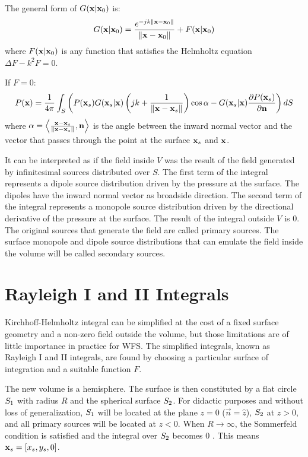 The general form of $G(\PosTheo \vert \PosTheo_0)$ is:
\begin{equation}
G(\PosTheo \vert \PosTheo_0) = \GreenFunc[\PosTheo - \PosTheo_0] + F(\PosTheo \vert \PosTheo_0)
\label{GreensFunction}
\end{equation}
where $F(\PosTheo \vert \PosTheo_0)$ is any function that satisfies the Helmholtz equation $\Delta F - k^2 F = 0$.

If $F = 0$:
\begin{equation}
P(\PosTheo) = \frac{1}{4\pi} \int_{S} \left(P(\PosTheo[surface]) G(\PosTheo[surface] \vert \PosTheo)\left(jk + \frac{1}{\norm{\PosTheo - \PosTheo[surface]}}\right)\cos\normSecondPropAngle - G(\PosTheo[surface] \vert \PosTheo) \frac{\partial P(\PosTheo[surface])}{\partial \mathbf{n}} \right) dS
\end{equation}
where $\normSecondPropAngle = \left\langle \frac{\PosTheo - \PosTheo[surface]}{\norm{\PosTheo - \PosTheo[surface]}} , \vec{n} \right\rangle$ is the angle between the inward normal vector and the vector that passes through the point at the surface $\PosTheo[surface]$ and $\PosTheo$.

It can be interpreted as if the field inside $V$ was the result of the field generated by infinitesimal sources distributed over $S$. The first term of the integral represents a dipole source distribution driven by the pressure at the surface. The dipoles have the inward normal vector as broadside direction. The second term of the integral represents a monopole source distribution driven by the directional derivative of the pressure at the surface. The result of the integral outside $V$ is $0$. The original sources that generate the field are called primary sources. The surface monopole and dipole source distributions that can emulate the field inside the volume will be called secondary sources.

\section{Rayleigh I and II Integrals}
Kirchhoff-Helmholtz integral can be simplified at the cost of a fixed surface geometry and a non-zero field outside the volume, but those limitations are of little importance in practice for WFS. The simplified integrals, known as Rayleigh I and II integrals, are found by choosing a particular surface of integration and a suitable function $F$.

The new volume is a hemisphere. The surface is then constituted by a flat circle $S_1$ with radius $R$ and the spherical surface $S_2$. For didactic purposes and without loss of generalization, $S_1$ will be located at the plane $z=0$ ($\vec{n} = \hat{z}$), $S_2$ at $z>0$, and all primary sources will be located at $z<0$. When $R\rightarrow\infty$, the Sommerfeld condition is satisfied and the integral over $S_2$ becomes $0$ \cite{Verheijen}. This means $\PosTheo[surface] = [x_s, y_s, 0]$.

